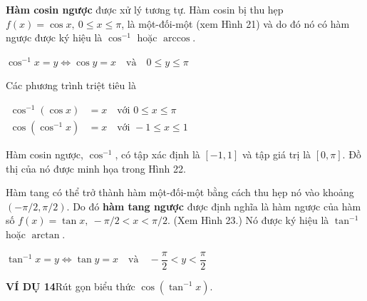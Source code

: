 \begin{minipage}[t]{0.71\textwidth}
    \vspace{0pt}
    \textbf{Hàm cosin ngược} được xử lý tương tự. Hàm cosin bị thu hẹp $f(x) = \cos x,\ 0 \leqslant x \leqslant \pi$, là một-đối-một (xem Hình 21) và do đó nó có hàm ngược được ký hiệu là $\cos^{-1}$ hoặc $\arccos$.

    \begin{tcolorbox}[colframe=stewartred, colback=white, sharp corners, boxrule=0.7pt, left=6pt, right=6pt, top=3pt, bottom=3pt, before skip=4pt, after skip=4pt]
        \centering
        $\cos^{-1}x = y \iff \cos y = x \quad \text{và} \quad 0 \leqslant y \leqslant \pi$
    \end{tcolorbox}

    Các phương trình triệt tiêu là
    
    \begin{tcolorbox}[colframe=stewartred, colback=white, sharp corners, boxrule=0.7pt, left=6pt, right=6pt, top=3pt, bottom=3pt, before skip=4pt, after skip=4pt]
        \centering
        $\begin{aligned}
        \cos^{-1}(\cos x) &= x \quad \text{với } 0 \leqslant x \leqslant \pi \\
        \cos(\cos^{-1}x) &= x \quad \text{với } -1 \leqslant x \leqslant 1
        \end{aligned}$
    \end{tcolorbox}

    Hàm cosin ngược, $\cos^{-1}$, có tập xác định là $[-1, 1]$ và tập giá trị là $[0, \pi]$. Đồ thị của nó được minh họa trong Hình 22.

    Hàm tang có thể trở thành hàm một-đối-một bằng cách thu hẹp nó vào khoảng $(-\pi/2, \pi/2)$. Do đó \textbf{hàm tang ngược} được định nghĩa là hàm ngược của hàm số $f(x) = \tan x,\ -\pi/2 < x < \pi/2$. (Xem Hình 23.) Nó được ký hiệu là $\tan^{-1}$ hoặc $\arctan$.

    \begin{tcolorbox}[colframe=stewartred, colback=white, sharp corners, boxrule=0.7pt, left=6pt, right=6pt, top=3pt, bottom=3pt, before skip=4pt, after skip=4pt]
        \centering
        $\tan^{-1}x = y \iff \tan y = x \quad \text{và} \quad -\dfrac{\pi}{2} < y < \dfrac{\pi}{2}$
    \end{tcolorbox}

    \vspace{2pt}
    \noindent\textbf{\textsf{\color{stewartcyan}VÍ DỤ 14}}\quad Rút gọn biểu thức $\cos(\tan^{-1}x)$.


\end{minipage}
